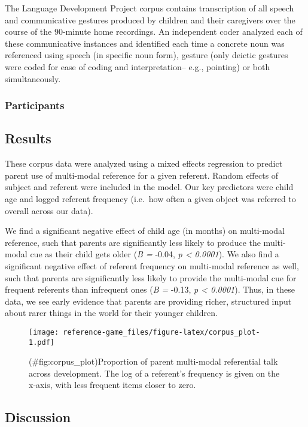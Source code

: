 \documentclass[english,,man,floatsintext]{apa6}
\begin{document}
The Language Development Project corpus contains transcription of all speech and communicative gestures produced by children and their caregivers over the course of the 90-minute home recordings. An independent coder analyzed each of these communicative instances and identified each time a concrete noun was referenced using speech (in specific noun form), gesture (only deictic gestures were coded for ease of coding and interpretation-- e.g., pointing) or both simultaneously.

\hypertarget{participants}{%
\subsubsection{Participants}\label{participants}}

\hypertarget{results}{%
\subsection{Results}\label{results}}

These corpus data were analyzed using a mixed effects regression to predict parent use of multi-modal reference for a given referent. Random effects of subject and referent were included in the model. Our key predictors were child age and logged referent frequency (i.e.~how often a given object was referred to overall across our data).

We find a significant negative effect of child age (in months) on multi-modal reference, such that parents are significantly less likely to produce the multi-modal cue as their child gets older (\emph{B =} -0.04, \emph{p \textless{} 0.0001}). We also find a significant negative effect of referent frequency on multi-modal reference as well, such that parents are significantly less likely to provide the multi-modal cue for frequent referents than infrequent ones (\emph{B =} -0.13, \emph{p \textless{} 0.0001}). Thus, in these data, we see early evidence that parents are providing richer, structured input about rarer things in the world for their younger children.

\begin{figure}
\centering
\texttt{[image: reference-game\_files/figure-latex/corpus\_plot-1.pdf]}
\caption{(\#fig:corpus\_plot)Proportion of parent multi-modal referential talk across development. The log of a referent's frequency is given on the x-axis, with less frequent items closer to zero.}
\end{figure}

\hypertarget{discussion}{%
\subsection{Discussion}\label{discussion}}
\end{document}

